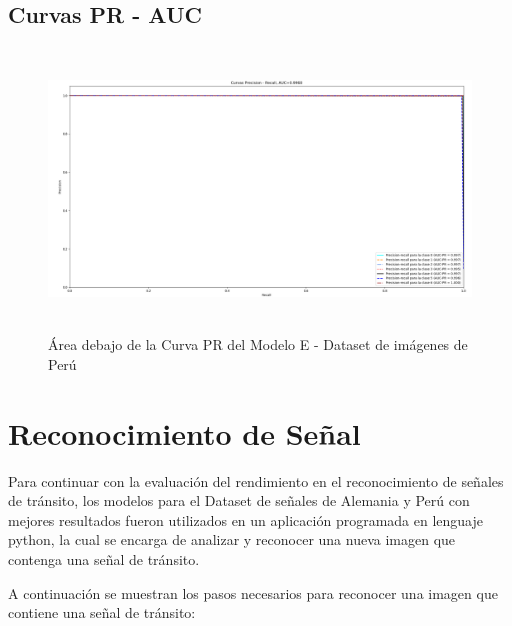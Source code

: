 		\subsection{Curvas PR - AUC}  
					\begin{figure}[H]
						\includegraphics[width=1\textwidth, height=7.5cm]{images/desarrollo/testResults/peru/PR_curve_modelE} 
						\begin{center}
						\caption{\small{Área debajo de la Curva PR del Modelo E - Dataset de imágenes de Perú}}
						{\small{\fontsize{10}{16.8}\selectfont {Fuente: Elaboración propia}}}
						\end{center}
						\vspace{-1.5em}
					\end{figure}
	\newpage
	
	
		
	\section{Reconocimiento de Señal}
		Para continuar con la evaluación del rendimiento en el reconocimiento de señales de tránsito, los modelos para el Dataset de señales de Alemania y Perú con mejores resultados fueron utilizados en un aplicación programada en lenguaje python, la cual se encarga de analizar y reconocer una nueva imagen que contenga una señal de tránsito.

		A continuación se muestran los pasos necesarios para reconocer una imagen que contiene una señal de tránsito:

